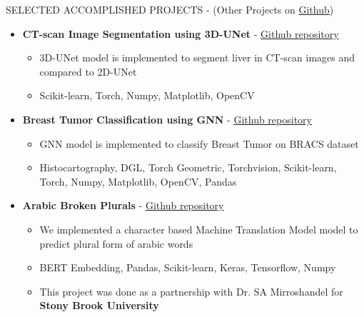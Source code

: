 \documentclass[]{CV}
\begin{document}
\vspace{-4mm}
\begin{section}{SELECTED ACCOMPLISHED PROJECTS { - (Other Projects on \href{https://github.com/amirkasaei}{Github})}}
\begin{itemize}


\item \textbf{CT-scan Image Segmentation using 3D-UNet} - \href{https://github.com/amirkasaei/CT-scan-Image-Segmentation-using-3D-UNet}{Github repository}
   \begin{itemize}
        \item 3D-UNet model is implemented to segment liver in CT-scan images and compared to 2D-UNet
        \item Scikit-learn, Torch, Numpy, Matplotlib, OpenCV
    \end{itemize}

\item \textbf{Breast Tumor Classification using GNN} - \href{https://github.com/amirkasaei/Breast-Tumor-Classification-using-GNN}{Github repository}
   \begin{itemize}
        \item GNN model is implemented  to classify Breast Tumor on BRACS dataset
        \item Histocartography, DGL, Torch Geometric, Torchvision, Scikit-learn, Torch, Numpy, Matplotlib, OpenCV, Pandas
    \end{itemize}
    
\item \textbf{Arabic Broken Plurals} - \href{https://github.com/amirkasaei/Arabic-Broken-Plurals}{Github repository}
   \begin{itemize}
        \item We implemented a character based Machine Translation Model model to predict plural form of arabic words
        \item BERT Embedding, Pandas, Scikit-learn, Keras, Tensorflow, Numpy
        \item This project was done as a partnership with Dr. SA Mirroshandel for \textbf{Stony Brook University}
    \end{itemize}
    

\end{itemize}
\end{section}
\end{document}
